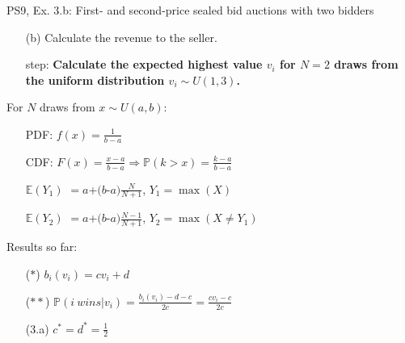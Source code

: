 \begin{frame}{PS9, Ex. 3.b: First- and second-price sealed bid auctions with two bidders}
    \begin{multicols}{2}
      \begin{itemize}
        \item[(b)] Calculate the revenue to the seller.
        \item[\nth{1} step:] \textbf{Calculate the expected highest value $v_i$ for $N=2$ draws from the uniform distribution $v_i\sim U(1,3)$.}
      \end{itemize}
      \vfill\null\columnbreak
      For $N$ draws from $x\sim U(a, b):$
      \vspace{-6pt}
      \begin{enumerate}
        \item[PDF:] $f(x)=\frac{1}{b-a}$
        \item[CDF:] $F(x)=\frac{x-a}{b-a}\Rightarrow\mathbb{P}(k>x)=\frac{k-a}{b-a}$
        \item[$\mathbb{E}(Y_1)$] $=a$+$(b$-$a)\frac{N}{N+1}$, $Y_1=\max(X)$
        \item[$\mathbb{E}(Y_2)$] $=a$+$(b$-$a)\frac{N-1}{N+1}$, $Y_2=\max(X\neq Y_1)$
      \end{enumerate}
      \vspace{-6pt}
      Results so far:
      \vspace{-6pt}
      \begin{itemize}
        \item[($*$)]  $b_i(v_i) = cv_i+d$
        \item[($**$)] $\mathbb{P}(i\ wins|v_i)=\frac{b_i(v_i)-d-c}{2c}=\frac{cv_i-c}{2c}$
        \item[(3.a)]    $c^*=d^*=\frac{1}{2}$
      \end{itemize}
      \vfill\null
    \end{multicols}
\end{frame}
